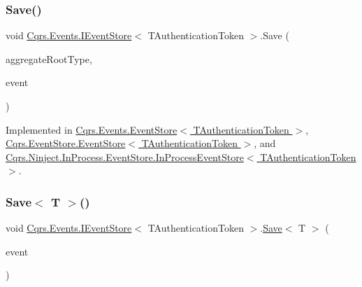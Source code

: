 \subsubsection{\texorpdfstring{Save()}{Save()}}
{\footnotesize\ttfamily void \hyperlink{interfaceCqrs_1_1Events_1_1IEventStore}{Cqrs.\+Events.\+I\+Event\+Store}$<$ T\+Authentication\+Token $>$.Save (\begin{DoxyParamCaption}\item[{Type}]{aggregate\+Root\+Type,  }\item[{\hyperlink{interfaceCqrs_1_1Events_1_1IEvent}{I\+Event}$<$ T\+Authentication\+Token $>$ @}]{event }\end{DoxyParamCaption})}



Implemented in \hyperlink{classCqrs_1_1Events_1_1EventStore_a3ba5ba04a36382b6d36a6ad8867dc766_a3ba5ba04a36382b6d36a6ad8867dc766}{Cqrs.\+Events.\+Event\+Store$<$ T\+Authentication\+Token $>$}, \hyperlink{classCqrs_1_1EventStore_1_1EventStore_adce33037e2a3eb81cfccded42ba2ed35_adce33037e2a3eb81cfccded42ba2ed35}{Cqrs.\+Event\+Store.\+Event\+Store$<$ T\+Authentication\+Token $>$}, and \hyperlink{classCqrs_1_1Ninject_1_1InProcess_1_1EventStore_1_1InProcessEventStore_a21816423f7b71249f3dc7ce14952e1e5_a21816423f7b71249f3dc7ce14952e1e5}{Cqrs.\+Ninject.\+In\+Process.\+Event\+Store.\+In\+Process\+Event\+Store$<$ T\+Authentication\+Token $>$}.

\mbox{\label{interfaceCqrs_1_1Events_1_1IEventStore_a92e768243d6602d09b786bbd06811ce6_a92e768243d6602d09b786bbd06811ce6}} 
\subsubsection{\texorpdfstring{Save$<$ T $>$()}{Save< T >()}}
{\footnotesize\ttfamily void \hyperlink{interfaceCqrs_1_1Events_1_1IEventStore}{Cqrs.\+Events.\+I\+Event\+Store}$<$ T\+Authentication\+Token $>$.\hyperlink{interfaceCqrs_1_1Events_1_1IEventStore_a81fb586703e7c6dea6b23d9a95f3887a_a81fb586703e7c6dea6b23d9a95f3887a}{Save}$<$ T $>$ (\begin{DoxyParamCaption}\item[{\hyperlink{interfaceCqrs_1_1Events_1_1IEvent}{I\+Event}$<$ T\+Authentication\+Token $>$ @}]{event }\end{DoxyParamCaption})}



